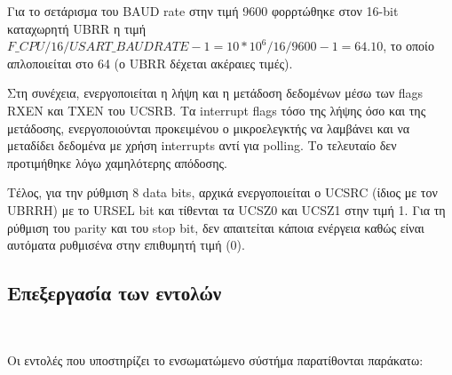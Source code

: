 \documentclass[a4paper,12pt]{article}
\begin{document}
Για το σετάρισμα του BAUD rate στην τιμή 9600 φορρτώθηκε στον 16-bit καταχωρητή UBRR η τιμή $F\_CPU/16/USART\_BAUDRATE - 1  = 10 * 10^6 / 16 / 9600 - 1 = 64.10$, το οποίο απλοποιείται στο 64 (ο UBRR δέχεται ακέραιες τιμές).

Στη συνέχεια, ενεργοποιείται η λήψη και η μετάδοση δεδομένων μέσω των flags RXEN και TXEN του UCSRB. Τα interrupt flags τόσο της λήψης όσο και της μετάδοσης, ενεργοποιούνται προκειμένου ο μικροελεγκτής να λαμβάνει και να μεταδίδει δεδομένα με χρήση interrupts αντί για polling. Το τελευταίο δεν προτιμήθηκε λόγω χαμηλότερης απόδοσης.

Τέλος, για την ρύθμιση 8 data bits, αρχικά ενεργοποιείται ο UCSRC (ίδιος με τον UBRRH) με το URSEL bit και τίθενται τα UCSZ0 και UCSZ1 στην τιμή 1. Για τη ρύθμιση του parity και του stop bit, δεν απαιτείται κάποια ενέργεια καθώς είναι αυτόματα ρυθμισένα στην επιθυμητή τιμή (0).




\subsection{Επεξεργασία των εντολών}\

Οι εντολές που υποστηρίζει το ενσωματώμενο σύστήμα παρατίθονται παράκατω:
\end{document}
